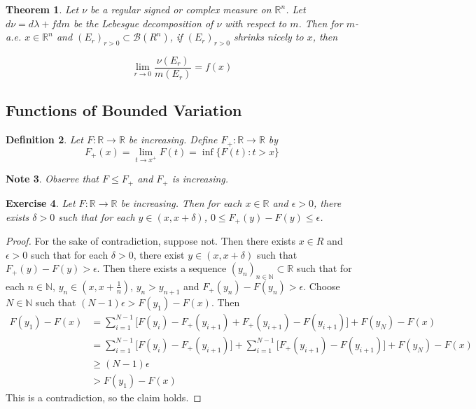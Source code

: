 \documentclass[12pt]{amsart}
\newtheorem{thm}{Theorem}[section]
\newtheorem{defn}[thm]{Definition}
\newtheorem{note}[thm]{Note}
\newtheorem{ex}[thm]{Exercise}
\newcommand{\del}{\delta}
\newcommand{\lam}{\lambda}
\newcommand{\ep}{\epsilon}
\newcommand{\N}{\mathbb{N}}
\newcommand{\R}{\mathbb{R}}
\newcommand{\MB}{\mathcal{B}}
\begin{document}
\begin{thm}
Let $\nu$ be a regular signed or complex measure on $\R^n$. Let $d\nu = d\lam + f dm$ be the Lebesgue decomposition of $\nu$ with respect to $m$. Then for $m$-a.e. $x \in \R^n$ and $(E_r)_{r >0} \subset \MB(R^n)$, if $(E_r)_{r >0}$ shrinks nicely to $x$, then 

$$\lim_{r \rightarrow 0} \frac{\nu(E_r)}{m(E_r)} = f(x)$$
\end{thm}

\subsection{Functions of Bounded Variation}

\begin{defn}
Let $F:\R \rightarrow \R$ be increasing. Define $F_+:\R \rightarrow \R$ by $$F_+(x) = \lim_{t \rightarrow x^+}F(t) = \inf \{F(t): t>x \}$$
\end{defn}

\begin{note}
Observe that $F \leq F_+$ and $F_+$ is increasing.
\end{note}

\begin{ex}
Let $F:\R \rightarrow \R$ be increasing. Then for each $x \in \R$ and $ \ep>0$, there exists $\del >0$ such that for each $y \in (x,x+\del)$, $0 \leq F_+(y) - F(y) \leq \ep$.
\end{ex}

\begin{proof}
For the sake of contradiction, suppose not. Then there exists $x \in R$ and $\ep >0$ such that for each $\del >0$, there exist $y \in (x,x+\del)$ such that $F_+(y) - F(y) > \ep$. Then there exists a sequence $(y_n)_{n \in \N} \subset \R$ such that for each $n \in \N$, $y_n \in (x, x+\frac{1}{n})$, $y_n > y_{n+1}$ and $F_+(y_n) - F(y_n) > \ep$. Choose $N \in \N$ such that $(N-1)\ep > F(y_1) - F(x)$. Then 
\begin{align*}
F(y_1) - F(x) 
&= \sum_{i=1}^{N-1} \bigg[F(y_i)-F_+(y_{i+1}) + F_+(y_{i+1}) - F(y_{i+1}) \bigg] + F(y_N)- F(x)\\
& = \sum_{i=1}^{N-1} \bigg[F(y_i)-F_+(y_{i+1}) \bigg] + \sum_{i=1}^{N-1} \bigg[ F_+(y_{i+1}) - F(y_{i+1}) \bigg] + F(y_N)- F(x) \\
& \geq (N-1)\ep \\
& > F(y_1) - F(x)
\end{align*}
This is a contradiction, so the claim holds.
\end{proof}
\end{document}
